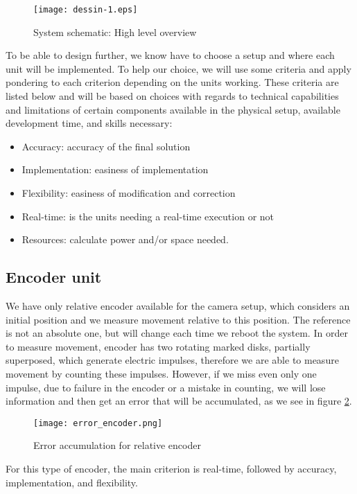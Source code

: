 \begin{figure}[!ht]
\centering
 \texttt{[image: dessin-1.eps]}
 \caption{System schematic: High level overview}
 \label{sys_sc}
\end{figure}

To be able to design further, we know have to choose a setup and where each unit will be implemented. To help our choice, we will use some criteria and apply pondering to each criterion depending on the units working. These criteria are listed below and will be based on choices with regards to technical capabilities and limitations of certain components available in the physical setup, available development time, and skills necessary: 
\begin{itemize}
 \item Accuracy: accuracy of the final solution
 \item Implementation: easiness of implementation
 \item Flexibility: easiness of modification and correction
 \item Real-time: is the units needing a real-time execution or not
 \item Resources: calculate power and/or space needed.
\end{itemize}


\subsection{Encoder unit}

We have only relative encoder available for the camera setup, which considers an initial position and we measure movement relative to this position. The reference is not an absolute one, but will change each time we reboot the system. In order to measure movement, encoder has two rotating marked disks, partially superposed, which generate electric impulses, therefore we are able to measure movement by counting these impulses. However, if we miss even only one impulse, due to failure in the encoder or a mistake in counting, we will lose information and then get an error that will be accumulated, as we see in figure \ref{err_enc}.  

\begin{figure}[!ht]
\centering
 \texttt{[image: error\_encoder.png]}
 \caption{Error accumulation for relative encoder}
 \label{err_enc}
\end{figure}

For this type of encoder, the main criterion is real-time, followed by accuracy, implementation, and flexibility.

